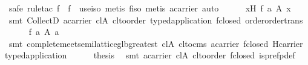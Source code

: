 \begin{isabellebody}
\ {}safe{}\ rule{}tac\ {}f\ {}\ f\ \ use{}iso{}{}\ metis\ f{}iso{}\ metis\ a{}carrier{}\ auto{}\isanewline
\ \ \ \ \isamarkupfalse%
\ {}{}x{}{}H{}\ f\ {}a\ {}\isactrlbsub A\isactrlesub \ x{}\ \isamarkupfalse%
\ {}smt\ CollectD\ a{}carrier\ cl{}A\ cl{}to{}order\ typed{}application\ f{}closed\ order{}order{}trans{}\isanewline
\ \ \ \ \isamarkupfalse%
\ {}f\ {}a\ {}\isactrlbsub A\isactrlesub \ {}a{}\ \isamarkupfalse%
\ {}smt\ complete{}meet{}semilattice{}glb{}greatest\ cl{}A\ cl{}to{}cms\ a{}carrier\ f{}closed\ H{}carrier\ typed{}application{}\isanewline
\ \ \ \ \isamarkupfalse%
\ {}thesis\ \isamarkupfalse%
\ {}smt\ a{}carrier\ cl{}A\ cl{}to{}order\ f{}closed\ is{}pre{}fp{}def{}\isanewline

\end{isabellebody}
